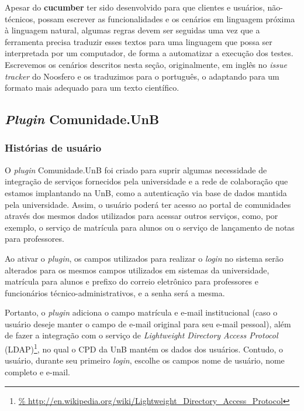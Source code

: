 Apesar do \textbf{cucumber} ter sido desenvolvido para que clientes e usuários,
não-técnicos, possam escrever as funcionalidades e os cenários em linguagem
próxima à linguagem natural, algumas regras devem ser seguidas uma vez que
a ferramenta precisa traduzir esses textos para uma linguagem que possa ser
interpretada por um computador, de forma a automatizar a execução dos testes.
%
Escrevemos os cenários descritos nesta seção, originalmente, em inglês no
\textit{issue tracker} do Noosfero e os traduzimos para o português,
o adaptando para um formato mais adequado para um texto científico.


\subsection{\textit{Plugin} Comunidade.UnB}

\subsubsection*{Histórias de usuário}

O \textit{plugin} Comunidade.UnB foi criado para suprir algumas necessidade de
integração de serviços fornecidos pela universidade e a rede de colaboração que
estamos implantando na UnB, como a autenticação via base de dados mantida pela universidade.
%
Assim, o usuário poderá ter acesso ao portal de comunidades através dos mesmos
dados utilizados para acessar outros serviços, como, por exemplo, o serviço de
matrícula para alunos ou o serviço de lançamento de notas para professores.

Ao ativar o \textit{plugin}, os campos utilizados para realizar o \textit{login}
no sistema serão alterados para os mesmos campos utilizados em sistemas da
universidade, matrícula para alunos e prefixo do correio eletrônico para
professores e funcionários técnico-administrativos, e a senha será a mesma.

Portanto, o \textit{plugin} adiciona o campo matrícula e e-mail institucional
(caso o usuário deseje manter o campo de e-mail original para seu e-mail
pessoal), além de fazer a integração com o serviço de \textit{Lightweight
Directory Access Protocol} (LDAP)\footnote{\url{%
http://en.wikipedia.org/wiki/Lightweight_Directory_Access_Protocol}},
no qual o CPD da UnB mantém os dados dos usuários. Contudo, o usuário, durante
seu primeiro \textit{login}, escolhe os campos nome de usuário, nome completo
e e-mail.

